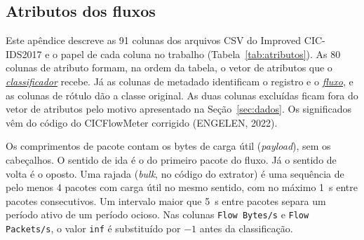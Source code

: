 \documentclass[
  12pt,
  oneside,
  a4paper,
  chapter=TITLE,
  sumario=tradicional,
  english,
  brazil
]{abntex2}
\newcommand{\termo}[2]{\hyperref[gl:#1]{\emph{#2}}}
\begin{document}
\begin{apendicesenv}
\partapendices

\chapter{Atributos dos fluxos}
\label{ap:atributos}

Este apêndice descreve as 91 colunas dos arquivos CSV do Improved CIC-IDS2017 e o papel de cada coluna
no trabalho (Tabela~\ref{tab:atributos}). As 80 colunas de atributo formam, na ordem da tabela, o
vetor de atributos que o \termo{classificador}{classificador} recebe. Já as colunas de metadado
identificam o registro e o \termo{fluxo}{fluxo}, e as colunas de rótulo dão a classe original. As
duas colunas excluídas ficam fora do vetor de atributos pelo motivo apresentado na
Seção~\ref{sec:dados}. Os significados vêm do código do CICFlowMeter corrigido (ENGELEN, 2022).

Os comprimentos de pacote contam os bytes de carga útil (\emph{payload}), sem os cabeçalhos. O
sentido de ida é o do primeiro pacote do fluxo. Já o sentido de volta é o oposto. Uma rajada
(\emph{bulk}, no código do extrator) é uma sequência de pelo menos 4 pacotes com carga útil no mesmo
sentido, com no máximo 1~s entre pacotes consecutivos. Um intervalo
maior que 5~s entre pacotes separa um período ativo de um período ocioso. Nas colunas
\texttt{Flow Bytes/s} e \texttt{Flow Packets/s}, o valor \texttt{inf} é substituído por $-1$ antes
da classificação.


\end{apendicesenv}
\end{document}
